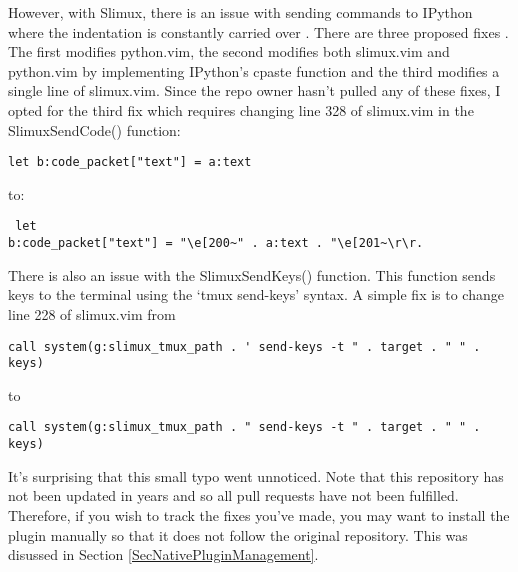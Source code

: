 However, with Slimux, there is an issue with sending commands to IPython where the
indentation is constantly carried over \cite{kmARC2015indentationerror}. There
are three proposed fixes
\cite{lotabout2017remove,karadaharu2016add,zcesur2018fix}. The first modifies
python.vim, the second modifies both slimux.vim and python.vim by implementing
IPython's cpaste function and the third modifies a single line of slimux.vim.
Since the repo owner hasn't pulled any of these fixes, I opted for the third fix
which requires changing line 328 of slimux.vim in the SlimuxSendCode() function:
\begin{lstlisting}
let b:code_packet["text"] = a:text
\end{lstlisting}
to:
\begin{lstlisting} let
b:code_packet["text"] = "\e[200~" . a:text . "\e[201~\r\r.
\end{lstlisting}
There is also an issue with the SlimuxSendKeys() function. This function sends
keys to the terminal using the `tmux send-keys' syntax. A simple fix is to
change line 228 of slimux.vim from
\begin{lstlisting}
call system(g:slimux_tmux_path . ' send-keys -t " . target . " " . keys)
\end{lstlisting}
to
\begin{lstlisting}
call system(g:slimux_tmux_path . " send-keys -t " . target . " " . keys)
\end{lstlisting}
It's surprising that this small typo went unnoticed. Note that this repository has not
been updated in years and so all pull requests have not been fulfilled.
Therefore, if you wish to track the fixes you've made, you may want to install
the plugin manually so that it does not follow the original repository. This was
disussed in Section \ref{SecNativePluginManagement}.\\


